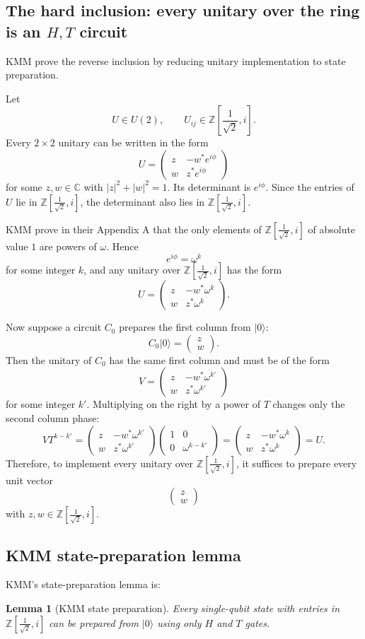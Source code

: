 \documentclass[11pt]{article}
\newtheorem{lemma}[theorem]{Lemma}
\newcommand{\C}{\mathbb C}
\newcommand{\Rring}{\mathbb Z\left[\frac{1}{\sqrt 2},i\right]}
\newcommand{\mat}[1]{\begin{pmatrix}#1\end{pmatrix}}
\begin{document}
\subsection{The hard inclusion: every unitary over the ring is an $H,T$ circuit}

KMM prove the reverse inclusion by reducing unitary implementation to state preparation.

Let
\[
  U\in U(2),\qquad U_{ij}\in\Rring.
\]
Every $2\times2$ unitary can be written in the form
\[
  U=\mat{z & -w^*e^{i\phi}\\ w & z^*e^{i\phi}}
\]
for some $z,w\in\C$ with $|z|^2+|w|^2=1$. Its determinant is $e^{i\phi}$. Since the entries of $U$ lie in $\Rring$, the determinant also lies in $\Rring$.

KMM prove in their Appendix A that the only elements of $\Rring$ of absolute value $1$ are powers of $\omega$. Hence
\[
  e^{i\phi}=\omega^k
\]
for some integer $k$, and any unitary over $\Rring$ has the form
\[
  U=\mat{z & -w^*\omega^k\\ w & z^*\omega^k}.
\]

Now suppose a circuit $C_0$ prepares the first column from $|0\rangle$:
\[
  C_0|0\rangle=\mat{z\\w}.
\]
Then the unitary of $C_0$ has the same first column and must be of the form
\[
  V=\mat{z & -w^*\omega^{k'}\\ w & z^*\omega^{k'}}
\]
for some integer $k'$. Multiplying on the right by a power of $T$ changes only the second column phase:
\[
  V T^{k-k'}=
  \mat{z & -w^*\omega^{k'}\\ w & z^*\omega^{k'}}
  \mat{1&0\\0&\omega^{k-k'}}
  =
  \mat{z & -w^*\omega^k\\ w & z^*\omega^k}=U.
\]
Therefore, to implement every unitary over $\Rring$, it suffices to prepare every unit vector
\[
  \mat{z\\w}
\]
with $z,w\in\Rring$.

\subsection{KMM state-preparation lemma}

KMM's state-preparation lemma is:
\begin{lemma}[KMM state preparation]
Every single-qubit state with entries in $\Rring$ can be prepared from $|0\rangle$ using only $H$ and $T$ gates.
\end{lemma}
\end{document}
